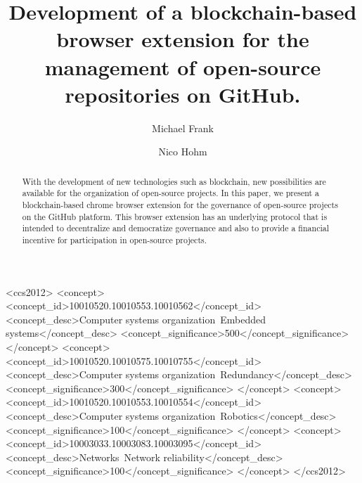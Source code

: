 \documentclass[sigconf]{acmart}
\begin{document}
\title{Development of a blockchain-based browser extension for the management of open-source repositories on GitHub.}

\author{Michael Frank}

\author{Nico Hohm}

\begin{abstract}
With the development of new technologies such as blockchain, new possibilities are available for the organization of open-source projects. In this paper, we present a blockchain-based chrome browser extension for the governance of open-source projects on the GitHub platform. This browser extension has an underlying protocol that is intended to decentralize and democratize governance and also to provide a financial incentive for participation in open-source projects.
\end{abstract}

\begin{CCSXML}
<ccs2012>
 <concept>
  <concept_id>10010520.10010553.10010562</concept_id>
  <concept_desc>Computer systems organization~Embedded systems</concept_desc>
  <concept_significance>500</concept_significance>
 </concept>
 <concept>
  <concept_id>10010520.10010575.10010755</concept_id>
  <concept_desc>Computer systems organization~Redundancy</concept_desc>
  <concept_significance>300</concept_significance>
 </concept>
 <concept>
  <concept_id>10010520.10010553.10010554</concept_id>
  <concept_desc>Computer systems organization~Robotics</concept_desc>
  <concept_significance>100</concept_significance>
 </concept>
 <concept>
  <concept_id>10003033.10003083.10003095</concept_id>
  <concept_desc>Networks~Network reliability</concept_desc>
  <concept_significance>100</concept_significance>
 </concept>
</ccs2012>
\end{CCSXML}

\end{document}
